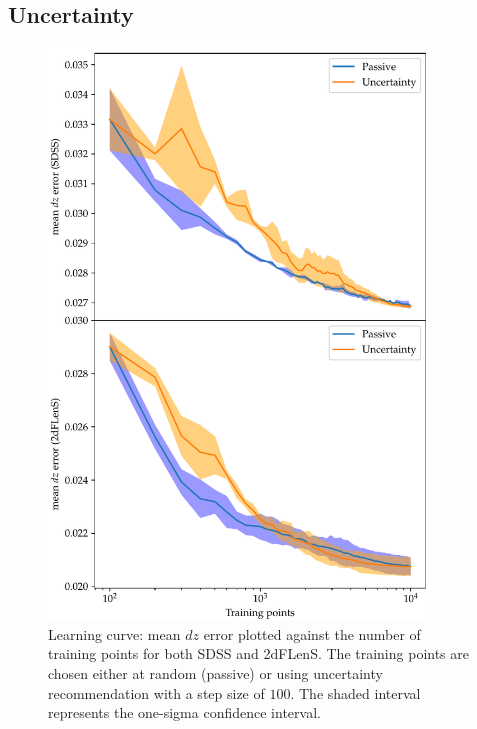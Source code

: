 \documentclass[11pt,twoside,openright]{report}
\begin{document}
\subsection{Uncertainty}
  \begin{figure}
    \centering
    \includegraphics[width=0.9\textwidth]{uncertainty_dz1.pdf}
    \caption{Learning curve: mean $dz$ error plotted against the number of training points for both SDSS and 2dFLenS. The training points are chosen either at random (passive) or using uncertainty recommendation with a step size of $100$. The shaded interval represents the one-sigma confidence interval.}
    \label{fig:uncertainty_dz1}
  \end{figure}
\end{document}
